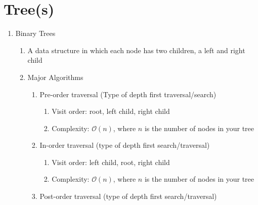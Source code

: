 \documentclass [12pt, executivepaper]{article}
\begin{document}
\pagebreak

\vspace*{-40mm}

\section*{Tree(s)}

\begin{enumerate}

\item Binary Trees

\begin{enumerate}

\item A data structure in which each node has two children, a left and right child

\item Major Algorithms

\begin{enumerate}

\item Pre-order traversal (Type of depth first traversal/search)

\begin{enumerate}

\item Visit order: root, left child, right child

\item Complexity: $\mathcal{O}(n)$, where $n$ is the number of nodes in your tree

\end{enumerate}

\item In-order traversal (type of depth first search/traversal)

\begin{enumerate}

\item Visit order: left child, root, right child

\item Complexity: $\mathcal{O}(n)$, where $n$ is the number of nodes in your tree

\end{enumerate}

\item Post-order traversal (type of depth first search/traversal)


\end{enumerate}
\end{enumerate}
\end{enumerate}
\end{document}
